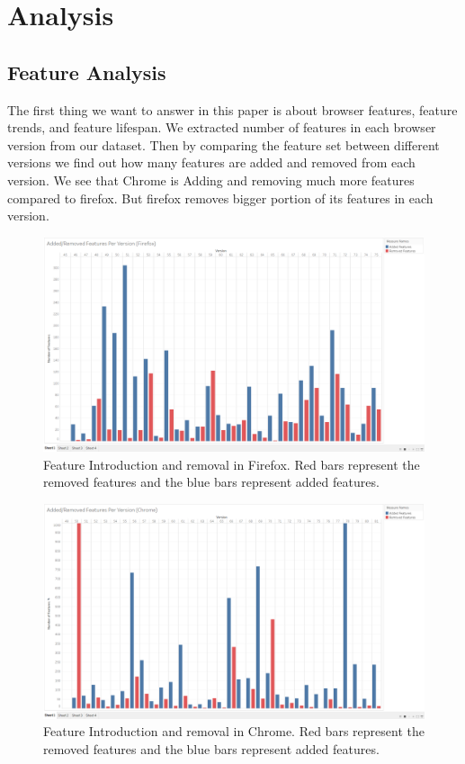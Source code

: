 \section{Analysis}
\label{sec: analysis}

\subsection{Feature Analysis}

The first thing we want to answer in this paper is about browser features, feature trends, and feature lifespan. We extracted number of features in each browser version from our dataset. Then by comparing the feature set between different versions we find out how many features are added and removed from each version. We see that Chrome is Adding and removing much more features compared to firefox. But firefox removes bigger portion of its features in each version.


\begin{figure}[ht]
    \centering
    \includegraphics[width=\columnwidth]{figures/Firefox-add-remove.png}
    \caption{Feature Introduction and removal in Firefox. Red bars represent the removed features and the blue bars represent added features.}
    \label{fig:times_bar}
\end{figure}


\begin{figure}[ht]
    \centering
    \includegraphics[width=\columnwidth]{figures/Chrome-add-remove.png}
    \caption{Feature Introduction and removal in Chrome. Red bars represent the removed features and the blue bars represent added features.}
    \label{fig:times_bar}
\end{figure}

